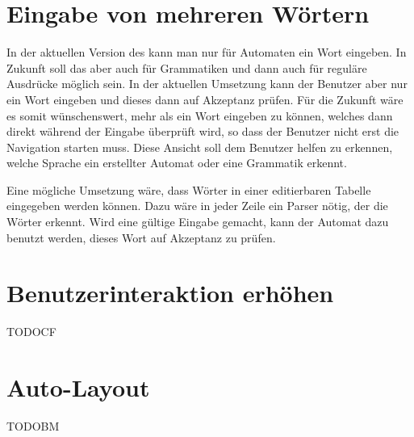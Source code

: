 \section{Eingabe von mehreren Wörtern}

In der aktuellen Version des \gtitools kann man nur für Automaten ein Wort
eingeben. In Zukunft soll das aber auch für Grammatiken und dann auch für
reguläre Ausdrücke möglich sein. In der aktuellen Umsetzung kann der Benutzer
aber nur ein Wort eingeben und dieses dann auf Akzeptanz prüfen. Für die
Zukunft wäre es somit wünschenswert, mehr als ein Wort eingeben zu können,
welches dann direkt während der Eingabe überprüft wird, so dass der Benutzer
nicht erst die Navigation starten muss. Diese Ansicht soll dem Benutzer helfen
zu erkennen, welche Sprache ein erstellter Automat oder eine Grammatik
erkennt.\vspace{10pt}

Eine mögliche Umsetzung wäre, dass Wörter in einer editierbaren Tabelle
eingegeben werden können. Dazu wäre in jeder Zeile ein Parser nötig, der die
Wörter erkennt. Wird eine gültige Eingabe gemacht, kann der Automat dazu
benutzt werden, dieses Wort auf Akzeptanz zu prüfen.


\section{Benutzerinteraktion erhöhen}

TODOCF


\section{Auto-Layout}\label{PerspectiveAutoLayout}

TODOBM
